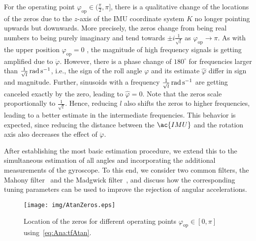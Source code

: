 For the operating point $\varphi_{\mathrm{op}}\in (\frac{\pi}{2},\pi]$, there is a qualitative change of the locations of the zeros due to the $z$-axis of the \ac{IMU} coordinate system $K$ no longer pointing upwards but downwards.
More precisely, the zeros change from being real numbers to being purely imaginary and tend towards $\pm i \frac{1}{\sqrt{l}}$ as $\varphi_{\mathrm{op}}\to\pi$.
As with the upper position $\varphi_\mathrm{op}=0$ , the magnitude of high frequency signals is getting amplified due to $\ddot{\varphi}$.
However, there is a phase change of $180^\circ$ for frequencies larger than $\SI[parse-numbers = false]{\frac{1}{\sqrt{l}}}{\radian\per\second}$, i.e., the sign of the roll angle $\varphi$ and its estimate $\hat{\varphi}$ differ in sign and magnitude.
Further, sinusoids with a frequency $\SI[parse-numbers = false]{\frac{1}{\sqrt{l}}}{\radian\per\second}$ are getting canceled exactly by the zero, leading to $\hat{\varphi}=0$.
%
Note that the zeros scale proportionally to $\frac{1}{\sqrt{l}}$.
Hence, reducing $l$ also shifts the zeros to higher frequencies, leading to a better estimate in the intermediate frequencies.
This behavior is expected, since reducing the distance between the $\ac{IMU}$ and the rotation axis also decreases the effect of $\ddot{\varphi}$.

After establishing the most basic estimation procedure, we extend this to the simultaneous estimation of all angles and incorporating the additional measurements of the gyroscope.
To this end, we consider two common filters, the Mahony filter~\cite{Mahony2008} and the Madgwick filter~\cite{Madgwick2011}, and discuss how the corresponding tuning parameters can be used to improve the rejection of angular accelerations.

\begin{figure}[tb]	
	\centering	
	\texttt{[image: img/AtanZeros.eps]} 
	\caption{Location of the zeros for different operating points $\varphi_{\mathrm{op}}\in [ 0,\pi ]$ using~\eqref{eq:Ana:tfAtan}.}
	\label{IMG:Ana:ZerosAtan}
\end{figure}	


